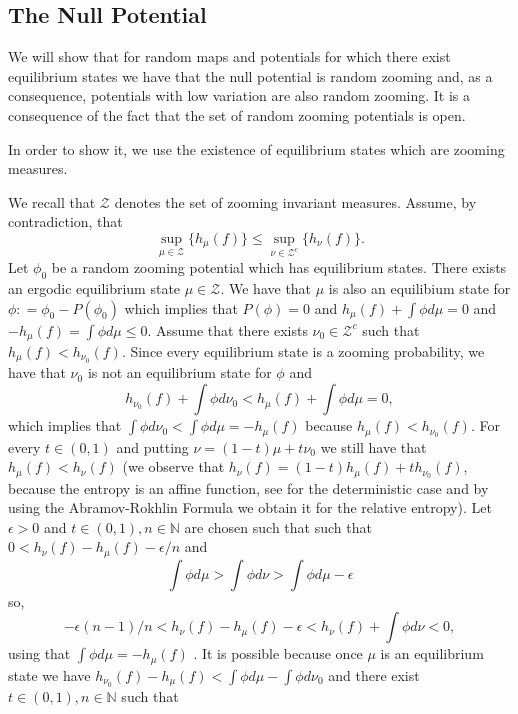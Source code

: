 \documentclass[12pt,a4paper]{amsart}
\theoremstyle{plain}
\begin{document}
	
	\subsection{The Null Potential} We will show that for random maps and potentials for which there exist equilibrium states we have that the null potential is random zooming and, as a consequence, potentials with low variation are also random zooming. It is a consequence of the fact that the set of random zooming potentials is open.
	
	In order to show it, we use the existence of equilibrium states which are zooming measures. 
	
	We recall that $\mathcal{Z}$ denotes the set of zooming invariant measures. Assume, by contradiction, that
	\[
	\sup_{\mu \in \mathcal{Z}}\{h_{\mu}(f)\} \leq \sup_{\nu \in \mathcal{Z}^{c}}\{h_{\nu}(f)\}.
	\]
	Let $\phi_{0}$ be a random zooming potential which has equilibrium states. There exists an ergodic equilibrium state $\mu \in \mathcal{Z}$. We have that $\mu$ is also an equilibium state for $\phi: = \phi_{0} - P(\phi_{0})$ which implies that $P(\phi) = 0$ and $h_{\mu}(f) + \int \phi d\mu = 0$ and $-h_{\mu}(f) = \int \phi d\mu \leq 0$. Assume that there exists $\nu_{0} \in \mathcal{Z}^{c}$ such that $h_{\mu}(f) < h_{\nu_{0}}(f)$. Since every equilibrium state is a zooming probability, we have that $\nu_{0}$ is not an equilibrium state for $\phi$ and
	\[
	h_{\nu_{0}}(f) + \int \phi d\nu_{0} < h_{\mu}(f) + \int \phi d\mu = 0,
	\]
	which implies that $\int \phi d\nu_{0} < \int \phi d\mu = -h_{\mu}(f)$ because $h_{\mu}(f) < h_{\nu_{0}}(f)$.  For every $t \in (0,1)$ and putting $\nu = (1-t)\mu + t\nu_{0}$ we still have that $h_{\mu}(f) < h_{\nu}(f)$ (we observe that $h_{\nu}(f) = (1-t)h_{\mu}(f) + th_{\nu_{0}}(f)$, because the entropy is an affine function, see \cite[Proposition 9.6.1]{OV} for the deterministic case and by using the Abramov-Rokhlin Formula we obtain it for the relative entropy). Let $\epsilon > 0$ and $t \in (0,1), n \in \mathbb{N}$ are chosen such that such that $0 < h_{\nu}(f) - h_{\mu}(f) -\epsilon/n$ and  
	\[ 
	\int \phi d\mu > \int \phi d\nu > \int \phi d\mu - \epsilon 
	\]
	so, 
	\[
	- \epsilon(n-1)/n < h_{\nu}(f) - h_{\mu}(f) -\epsilon < h_{\nu}(f) + \int \phi d\nu < 0,
	\]
	using that $\int \phi d\mu = -h_{\mu}(f)$ . It is possible because once $\mu$ is an equilibrium state we have $h_{\nu_{0}}(f) - h_{\mu}(f) < \int \phi d\mu - \int \phi d\nu_{0}$ and there exist $t \in (0,1), n \in \mathbb{N}$ such that
	
\end{document}
